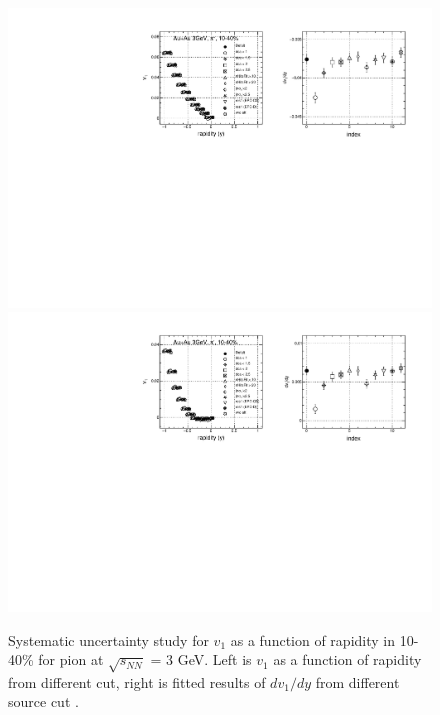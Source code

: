 \begin{figure}[h]
\includegraphics[scale=0.5]{chapter3/fig/sys/pion/v1y_pip_sys.pdf}
\includegraphics[scale=0.5]{chapter3/fig/sys/pion/v1y_pim_sys.pdf}
\caption{Systematic uncertainty study for $v_{1}$ as a function of rapidity in 10-40\% for pion at $\sqrt{s_{NN}}$ = 3 GeV. Left is $v_{1}$ as a function of rapidity from different cut, right is fitted results of $dv_{1}/dy$ from different source cut .}
\label{pion_v1y_sys}
\end{figure}

